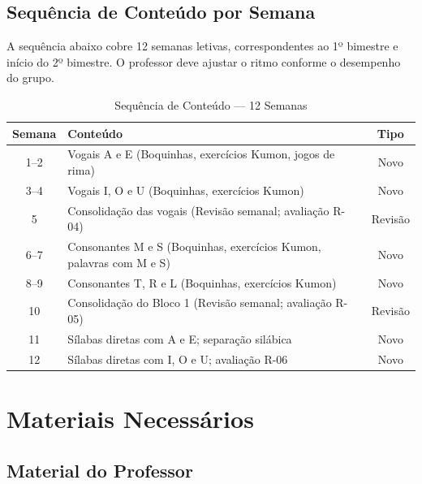 \section{Sequ\^{e}ncia de Conte\'{u}do por Semana}

A sequ\^{e}ncia abaixo cobre 12 semanas letivas, correspondentes ao
1º bimestre e in\'{i}cio do 2º bimestre. O professor deve ajustar
o ritmo conforme o desempenho do grupo.

\begin{table}[h]
\centering
\caption{Sequ\^{e}ncia de Conte\'{u}do --- 12 Semanas}
\label{tab:sequencia}
\begin{tabular}{|c|p{8cm}|c|}
\hline
\textbf{Semana} & \textbf{Conte\'{u}do} & \textbf{Tipo} \\
\hline
1--2 & Vogais A e E (Boquinhas, exerc\'{i}cios Kumon, jogos de rima) &
Novo \\
\hline
3--4 & Vogais I, O e U (Boquinhas, exerc\'{i}cios Kumon) &
Novo \\
\hline
5 & Consolida\c{c}\~{a}o das vogais (Revis\~{a}o semanal; avalia\c{c}\~{a}o R-04) &
Revis\~{a}o \\
\hline
6--7 & Consonantes M e S (Boquinhas, exerc\'{i}cios Kumon, palavras com M e S) &
Novo \\
\hline
8--9 & Consonantes T, R e L (Boquinhas, exerc\'{i}cios Kumon) &
Novo \\
\hline
10 & Consolida\c{c}\~{a}o do Bloco 1 (Revis\~{a}o semanal; avalia\c{c}\~{a}o R-05) &
Revis\~{a}o \\
\hline
11 & S\'{i}labas diretas com A e E; separa\c{c}\~{a}o sil\'{a}bica &
Novo \\
\hline
12 & S\'{i}labas diretas com I, O e U; avalia\c{c}\~{a}o R-06 &
Novo \\
\hline
\end{tabular}
\end{table}


\chapter{Materiais Necess\'{a}rios}

\section{Material do Professor}

